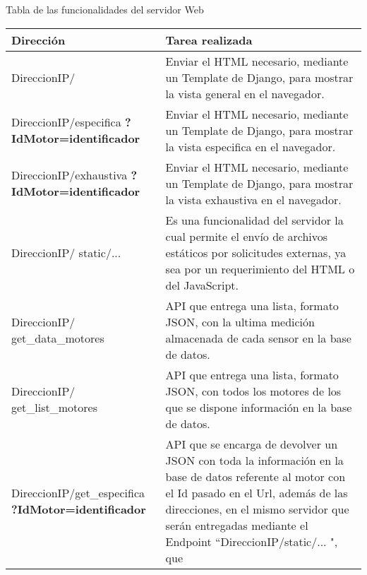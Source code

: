     \begin{table}[ht]
        \begin{center}
            Tabla de las funcionalidades del servidor Web   \\

            \vspace{0.3cm}
            \begin{tabular}{|p{5cm}|p{10cm}|}
                \hline
                Dirección       & Tarea realizada
                \\\hline\hline
                DireccionIP/ &
                Enviar el HTML necesario, mediante un Template de Django,
                para mostrar la vista general en el navegador.
                \\\hline
                DireccionIP/especifica \textbf{?IdMotor=identificador}&
                Enviar el HTML necesario, mediante un Template de Django,
                para mostrar la vista especifica en el navegador.
                \\\hline
                DireccionIP/exhaustiva \textbf{?IdMotor=identificador}  &
                Enviar el HTML necesario, mediante un Template de Django,
                para mostrar la vista exhaustiva en el navegador.
                \\\hline
                DireccionIP/ static/... &
                Es una funcionalidad del servidor la cual permite el envío de
                archivos estáticos por solicitudes externas, ya sea por un
                requerimiento del HTML o del JavaScript.
                \\\hline
                DireccionIP/ get\_data\_motores &
                API que entrega  una lista, formato JSON,
                con la ultima medición almacenada de cada sensor en la base de
                datos.
                \\\hline
                DireccionIP/ get\_list\_motores &
                API que entrega una lista, formato JSON,
                con todos los motores de los que se
                dispone información en la base de datos.
                \\\hline
                DireccionIP/get\_especifica \textbf{?IdMotor=identificador}&
                API que se encarga de devolver un JSON con toda la información
                en la base de datos referente al motor con el Id pasado en el
                Url, además de las direcciones, en el mismo servidor que serán
                entregadas mediante el Endpoint ``DireccionIP/static/... ", que

\end{tabular}
\end{center}
\end{table}
